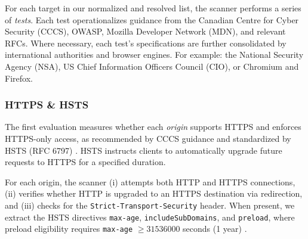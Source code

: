 \documentclass[conference]{IEEEtran}
\begin{document}
For each target in our normalized and resolved list, the scanner performs a series of \emph{tests}. 
Each test operationalizes guidance from the Canadian Centre for 
Cyber Security (CCCS), OWASP, Mozilla Developer Network (MDN), and relevant RFCs. 
Where necessary, each test's specifications are further
consolidated by international authorities and browser engines. For example: the National Security Agency (NSA), 
US Chief Information Officers Council (CIO), or Chromium and Firefox.

\subsubsection{HTTPS \& HSTS}

The first evaluation measures whether each \emph{origin} supports HTTPS and enforces HTTPS-only
 access, as recommended by CCCS guidance \cite{cccs-itsp-40062,cccs-itsm-60005} and standardized by HSTS
  (RFC 6797) \cite{rfc6797}. HSTS instructs clients to automatically upgrade future requests to HTTPS for a specified duration.

For each origin, the scanner (i) attempts both HTTP and HTTPS connections, (ii) verifies whether HTTP
is upgraded to an HTTPS destination via redirection, and (iii) checks for the \texttt{Strict-Transport-Security} header.
When present, we extract the HSTS directives \texttt{max-age}, \texttt{includeSubDomains}, and \texttt{preload}, where preload
eligibility requires \texttt{max-age} $\ge 31536000$ seconds (1 year) \cite{mdn_sts_header,chromium_hsts_preload}.



\end{document}
